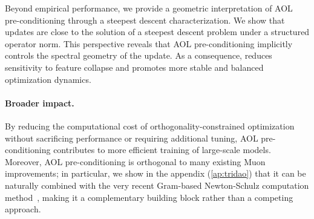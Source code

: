 Beyond empirical performance, we provide a geometric interpretation of AOL pre-conditioning through a steepest descent characterization. We show that \turbomuon updates are close to the solution of a steepest descent problem under a structured operator norm. This perspective reveals that AOL pre-conditioning implicitly controls the spectral geometry of the update. As a consequence, \turbomuon reduces sensitivity to feature collapse and promotes more stable and balanced optimization dynamics.

\paragraph{Broader impact.}
By reducing the computational cost of orthogonality-constrained optimization without sacrificing performance or requiring additional tuning, AOL pre-conditioning contributes to more efficient training of large-scale models. Moreover, AOL pre-conditioning is orthogonal to many existing Muon improvements; in particular, we show in the appendix (\cref{ap:tridao}) that it can be naturally combined with the very recent Gram-based Newton-Schulz computation method~\cite{GramNewtonSchulz}, making it a complementary building block rather than a competing approach.


